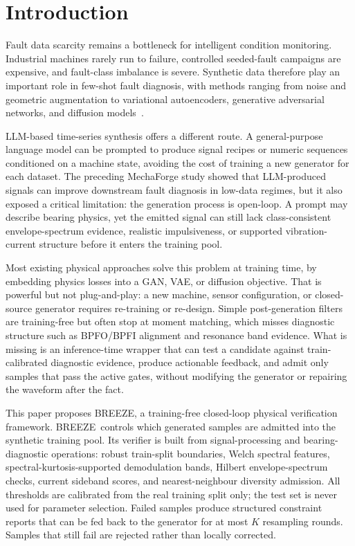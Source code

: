 \documentclass[review,3p,times]{elsarticle}
\newcommand{\breeze}{BREEZE}
\begin{document}
\section{Introduction}
\label{sec:intro}

Fault data scarcity remains a bottleneck for intelligent condition monitoring.
Industrial machines rarely run to failure, controlled seeded-fault campaigns
are expensive, and fault-class imbalance is severe. Synthetic data therefore
play an important role in few-shot fault diagnosis, with methods ranging from
noise and geometric augmentation to variational autoencoders, generative
adversarial networks, and diffusion models~\cite{goodfellow,kingma,ho}.

LLM-based time-series synthesis offers a different route. A general-purpose
language model can be prompted to produce signal recipes or numeric sequences
conditioned on a machine state, avoiding the cost of training a new generator
for each dataset. The preceding MechaForge study showed that LLM-produced
signals can improve downstream fault diagnosis in low-data regimes, but it
also exposed a critical limitation: the generation process is open-loop. A
prompt may describe bearing physics, yet the emitted signal can still lack
class-consistent envelope-spectrum evidence, realistic impulsiveness, or
supported vibration-current structure before it enters the training pool.

Most existing physical approaches solve this problem at training time, by
embedding physics losses into a GAN, VAE, or diffusion objective. That is
powerful but not plug-and-play: a new machine, sensor configuration, or
closed-source generator requires re-training or re-design. Simple
post-generation filters are training-free but often stop at moment matching,
which misses diagnostic structure such as BPFO/BPFI alignment and resonance
band evidence. What is missing is an inference-time wrapper that can test a
candidate against train-calibrated diagnostic evidence, produce actionable
feedback, and admit only samples that pass the active gates, without modifying
the generator or repairing the waveform after the fact.

This paper proposes \breeze, a training-free closed-loop physical verification
framework. \breeze\ controls which generated samples are admitted into the
synthetic training pool. Its verifier is built from signal-processing and
bearing-diagnostic operations: robust train-split boundaries, Welch spectral
features, spectral-kurtosis-supported demodulation bands, Hilbert
envelope-spectrum checks, current sideband scores, and nearest-neighbour
diversity admission. All thresholds are calibrated from the real training
split only; the test set is never used for parameter selection. Failed samples
produce structured constraint reports that can be fed back to the generator
for at most $K$ resampling rounds. Samples that still fail are rejected rather
than locally corrected.
\end{document}
